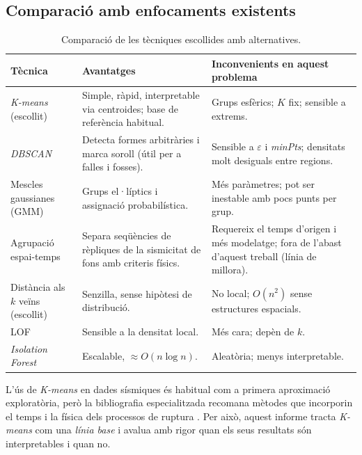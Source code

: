 \documentclass[11pt,a4paper]{article}
\begin{document}
\subsection{Comparació amb enfocaments existents}
\begin{table}[htbp]
\centering
\small
\begin{tabularx}{\textwidth}{@{}>{\raggedright\arraybackslash}p{2.7cm}>{\raggedright\arraybackslash}X>{\raggedright\arraybackslash}X@{}}
\toprule
\textbf{Tècnica} & \textbf{Avantatges} & \textbf{Inconvenients en aquest problema} \\
\midrule
\textit{K-means} (escollit) & Simple, ràpid, interpretable via centroides;
  base de referència habitual. & Grups esfèrics; $K$ fix; sensible a extrems. \\
\textit{DBSCAN} \cite{ester1996} & Detecta formes arbitràries i marca soroll
  (útil per a falles i fosses). & Sensible a $\varepsilon$ i \textit{minPts};
  densitats molt desiguals entre regions. \\
Mescles gaussianes (GMM) & Grups el·líptics i assignació probabilística. &
  Més paràmetres; pot ser inestable amb pocs punts per grup. \\
Agrupació espai-temps \cite{zaliapin2013} & Separa seqüències de rèpliques de
  la sismicitat de fons amb criteris físics. & Requereix el temps d'origen i
  més modelatge; fora de l'abast d'aquest treball (línia de millora). \\
\midrule
Distància als $k$ veïns (escollit) & Senzilla, sense hipòtesi de distribució. &
  No local; $O(n^2)$ sense estructures espacials. \\
LOF & Sensible a la densitat local. & Més cara; depèn de $k$. \\
\textit{Isolation Forest} & Escalable, $\approx O(n\log n)$. &
  Aleatòria; menys interpretable. \\
\bottomrule
\end{tabularx}
\caption{Comparació de les tècniques escollides amb alternatives.}\label{tab:comparacio}
\end{table}

L'ús de \textit{K-means} en dades sísmiques és habitual com a primera
aproximació exploratòria, però la bibliografia especialitzada recomana
mètodes que incorporin el temps i la física dels processos de ruptura
\cite{zaliapin2013}. Per això, aquest informe tracta \textit{K-means} com una
\emph{línia base} i avalua amb rigor quan els seus resultats són
interpretables i quan no.

\end{document}
